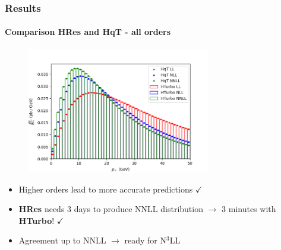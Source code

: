 \documentclass[aspectratio=43]{beamer}
\begin{document}
\begin{frame}
	
	\frametitle{Results}
	\framesubtitle{Comparison HRes and HqT - all orders}
	
	\begin{figure}
		\includegraphics[width = 8cm]{plots/hturbo_all_orders.png}
	\end{figure}
	
	\begin{itemize}
		\item \footnotesize Higher orders lead to more accurate predictions {\color{darkgreen}$\checkmark$} 
		\item \footnotesize \textbf{HRes} needs 3 days to produce NNLL distribution $\rightarrow$ {\color{blue} 3 minutes with \textbf{HTurbo}!} {\color{darkgreen}$\checkmark$} 
		\item \footnotesize Agreement up to NNLL $\longrightarrow$ {\color{blue}ready for N$^{3}$LL}
	\end{itemize}

\end{frame}
\end{document}
